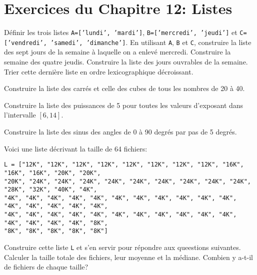 

\section*{Exercices du Chapitre 12: Listes}

\begin{exercice}
Définir les trois listes
\texttt{A=['lundi', 'mardi']},
\texttt{B=['mercredi', 'jeudi']} et
\texttt{C=['vendredi', 'samedi', 'dimanche']}.
En utilisant \texttt{A}, \texttt{B} et \texttt{C},
construire la liste des sept jours de la semaine à laquelle on a enlevé mercredi.
Construire la semaine des quatre jeudis.
Construire la liste des jours ouvrables de la semaine. 
Trier cette dernière liste en ordre lexicographique décroissant.
\end{exercice}

\begin{exercice}
Construire la liste des carrés et celle des cubes de tous les nombres de 20 à 40.
\end{exercice}

\begin{exercice}
Construire la liste des puissances de 5 pour toutes les valeurs d'exposant
dans l'intervalle $[6,14]$.
\end{exercice}

\begin{exercice}
Construire la liste des sinus des angles de 0 à 90 degrés par pas de 5 degrés.
\end{exercice}

\begin{exercice}
Voici une liste décrivant la taille de 64 fichiers:
{\footnotesize
\begin{verbatim}
L = ["12K", "12K", "12K", "12K", "12K", "12K", "12K", "12K", "16K", "16K", "16K", "20K", "20K", 
"20K", "24K", "24K", "24K", "24K", "24K", "24K", "24K", "24K", "24K", "28K", "32K", "40K", "4K", 
"4K", "4K", "4K", "4K", "4K", "4K", "4K", "4K", "4K", "4K", "4K", "4K", "4K", "4K", "4K", "4K", 
"4K", "4K", "4K", "4K", "4K", "4K", "4K", "4K", "4K", "4K", "4K", "4K", "4K", "4K", "4K", "8K", 
"8K", "8K", "8K", "8K", "8K"] 
\end{verbatim}
}
Construire cette liste \texttt{L} et s'en servir pour répondre aux queestions
suivantes. Calculer la taille totale des fichiers,
leur moyenne et la médiane.
Combien y a-t-il de fichiers de chaque taille?
\end{exercice}


